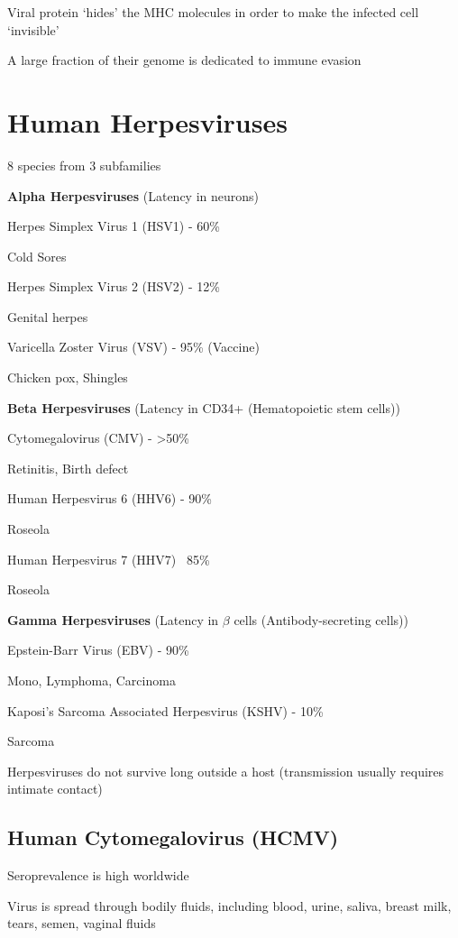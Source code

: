 \documentclass{notes}
\begin{document}
\tab Viral protein `hides' the MHC molecules in order to make the infected cell `invisible'

\tab A large fraction of their genome is dedicated to immune evasion

\section{Human Herpesviruses}

8 species from 3 subfamilies

\textbf{Alpha Herpesviruses} (Latency in neurons)

Herpes Simplex Virus 1 (HSV1) - 60\%

\tab Cold Sores

Herpes Simplex Virus 2 (HSV2) - 12\%

\tab Genital herpes

Varicella Zoster Virus (VSV) - 95\% (Vaccine)

\tab Chicken pox, Shingles

\textbf{Beta Herpesviruses} (Latency in CD34+ (Hematopoietic stem cells))

Cytomegalovirus (CMV) - \textgreater 50\%

\tab Retinitis, Birth defect

Human Herpesvirus 6 (HHV6) - 90\%

\tab Roseola

Human Herpesvirus 7 (HHV7) \ 85\%

\tab Roseola

\textbf{Gamma Herpesviruses} (Latency in \(\beta\) cells (Antibody-secreting cells))

Epstein-Barr Virus (EBV) - 90\%

\tab Mono, Lymphoma, Carcinoma

Kaposi's Sarcoma Associated Herpesvirus (KSHV) - 10\%

\tab Sarcoma

Herpesviruses do not survive long outside a host (transmission usually requires intimate contact)

\subsection{Human Cytomegalovirus (HCMV)}

Seroprevalence is high worldwide

Virus is spread through bodily fluids, including blood, urine, saliva, breast milk, tears, semen, vaginal fluids
\end{document}
